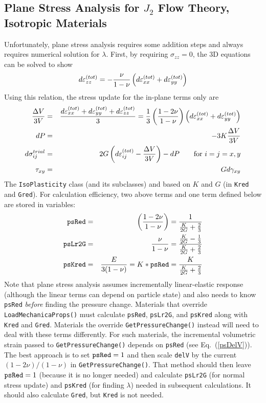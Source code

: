 \documentclass[11pt]{article}
\def\code#1{{\small\tt #1}}
\def\s#1{\sigma_{#1}}
\begin{document}
\subsection{Plane Stress Analysis for $J_2$ Flow Theory, Isotropic Materials}

Unfortunately, plane stress analysis requires some addition steps and always requires numerical solution for $\lambda$. First, by requiring $\s{zz}=0$, the 3D equations can be solved to show
\begin{equation}
         d\varepsilon_{zz}^{(tot)} = - {\nu\over 1-\nu}\left(d\varepsilon_{xx}^{(tot)} + d\varepsilon_{yy}^{(tot)}\right)
\end{equation}
Using this relation, the stress update for the in-plane terms only are
\begin{eqnarray}
       {\Delta V\over 3V} & = & {d\varepsilon_{xx}^{(tot)} + d\varepsilon_{yy}^{(tot)} + d\varepsilon_{zz}^{(tot)} \over 3} 
                             = {1\over 3}\left(1-2\nu\over 1-\nu\right)\left(d\varepsilon_{xx}^{(tot)} + d\varepsilon_{yy}^{(tot)}\right)      \label{psDelV} \\
       dP & = & -3K {\Delta V\over 3V} \\
       d\s{ij}^{trial} & = & 2G \left(d\varepsilon_{ij}^{(tot)} - {\Delta V\over 3V}\right) - dP  \qquad {\rm for\ }i=j=x,y\\
       \tau_{xy} & = & G d\gamma_{xy} \\
\end{eqnarray}
The \code{IsoPlasticity} class (and its subclasses) and based on $K$ and $G$ (in \code{Kred} and \code{Gred}). For calculation efficiency, two above terms and one term defined below are stored in variables:
\begin{eqnarray}
       \code{psRed} & = & \left(1-2\nu\over 1-\nu\right) = {1 \over {K\over 2G} + {2\over 3}} \\
       \code{psLr2G} & = & {\nu\over 1-\nu} ={{K\over 2G} - {1\over 3} \over {K\over 2G} + {2\over 3}} \\
       \code{psKred} & = & {E\over 3(1-\nu)} = K*\code{psRed} = {K \over {K\over 2G} + {2\over 3}}
\end{eqnarray}
Note that plane stress analysis assumes incrementally linear-elastic response (although the linear terms can depend on particle state) and also needs to know \code{psRed}  \emph{before} finding the pressure change. Materials that override \code{LoadMechanicaProps()} must calculate \code{psRed}, \code{psLr2G}, and \code{psKred} along with \code{Kred} and \code{Gred}. Materials the override \code{GetPressureChange()} instead will need to deal with these terms differently. For such materials, the incremental volumetric strain passed to \code{GetPressureChange()} depends on \code{psRed} (see Eq.~(\ref{psDelV})). The best approach is to set $\code{psRed}=1$ and then scale \code{delV} by the current $(1-2\nu)/(1-\nu)$ in \code{GetPressureChange()}. That method should then leave $\code{psRed}=1$ (because it is no longer needed) and calculate \code{psLr2G} (for normal stress update) and \code{psKred} (for finding $\lambda$) needed in subsequent calculations. It should also calculate \code{Gred}, but \code{Kred} is not needed.
\end{document}
